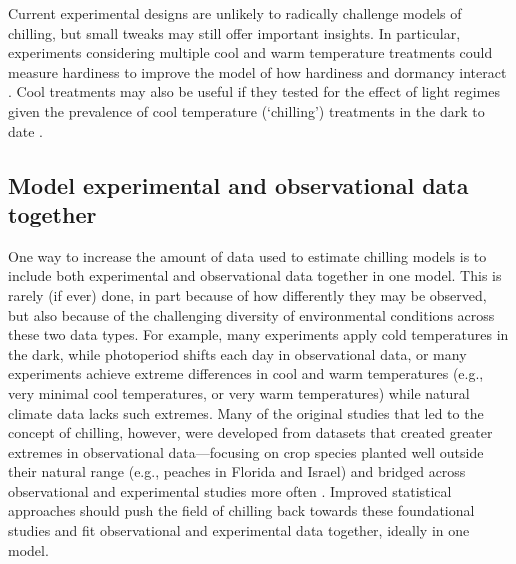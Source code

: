 \documentclass[11pt]{article}
\begin{document}
Current experimental designs are unlikely to radically challenge models of chilling, but small tweaks may still offer important insights. In particular, experiments considering multiple cool and warm temperature treatments could measure hardiness to improve the model of how hardiness and dormancy interact \citep{kovaleskipreprint}. Cool treatments may also be useful if they tested for the effect of light regimes given the prevalence of cool temperature (`chilling') treatments in the dark to date \citep{ospreebbms}. 

\subsection*{Model experimental and observational data together} 
One way to increase the amount of data used to estimate chilling models is to include both experimental and observational data together in one model. This is rarely (if ever) done, in part because of how differently they may be observed, but also because of the challenging diversity of environmental conditions across these two data types. 
For example, many experiments apply cold temperatures in the dark, while photoperiod shifts each day in observational data, or many experiments achieve extreme differences in cool and warm temperatures (e.g., very minimal cool temperatures, or very warm temperatures) while natural climate data lacks such extremes. Many of the original studies that led to the concept of chilling, however, were developed from datasets that created greater extremes in observational data---focusing on crop species planted well outside their natural range (e.g., peaches in Florida and Israel) and bridged across observational and experimental studies more often \citep{erez1971,richardson1974}. Improved statistical approaches should push the field of chilling back towards these foundational studies and fit observational and experimental data together, ideally in one model.  
\end{document}
